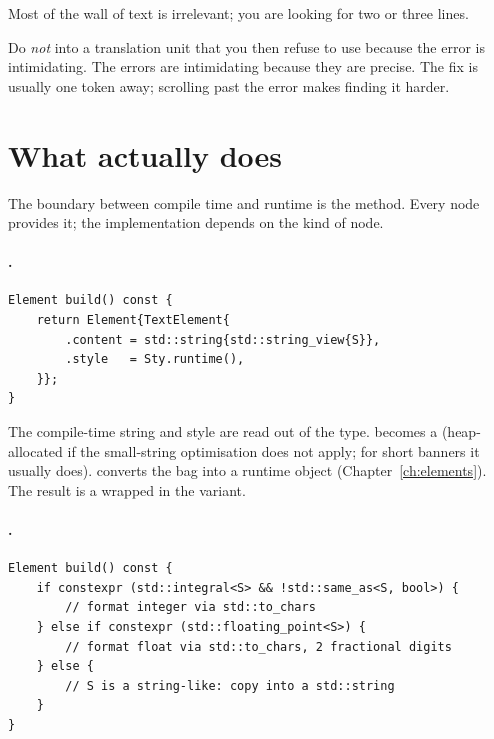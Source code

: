 Most of the wall of text is irrelevant; you are looking for two or
three lines.

\begin{warning}
Do \emph{not}  into a translation
unit that you then refuse to use because the error is intimidating.
The errors are intimidating because they are precise. The fix is
usually one token away; scrolling past the error makes finding it
harder.
\end{warning}

\section{What  actually does}
\label{sec:dsl:build}

The boundary between compile time and runtime is the 
method. Every node provides it; the implementation depends on the
kind of node.

\paragraph{.}

\begin{lstlisting}
Element build() const {
    return Element{TextElement{
        .content = std::string{std::string_view{S}},
        .style   = Sty.runtime(),
    }};
}
\end{lstlisting}

The compile-time string  and style  are read out
of the type.  becomes a  (heap-allocated
if the small-string optimisation does not apply; for short banners
it usually does).  converts the
 bag into a runtime  object (Chapter~\ref{ch:elements}).
The result is a  wrapped in the 
variant.

\paragraph{.}

\begin{lstlisting}
Element build() const {
    if constexpr (std::integral<S> && !std::same_as<S, bool>) {
        // format integer via std::to_chars
    } else if constexpr (std::floating_point<S>) {
        // format float via std::to_chars, 2 fractional digits
    } else {
        // S is a string-like: copy into a std::string
    }
}
\end{lstlisting}


